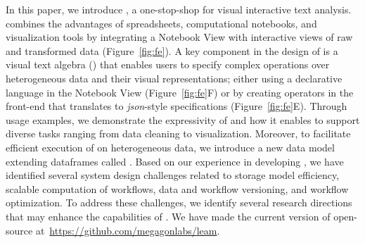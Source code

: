 

In this paper, we introduce \system, a one-stop-shop for visual interactive text analysis. \system combines the advantages of spreadsheets, computational notebooks, and visualization tools by integrating a Notebook View with interactive views of raw and transformed data (Figure~\ref{fig:fe}). A key component in the design of \system is a visual text algebra (\vta) that enables users to specify complex \vita operations over heterogeneous data and their visual representations; either using a declarative language in the Notebook View (Figure~\ref{fig:fe}F) or by creating operators in the front-end that translates to \emph{json}-style \vta specifications (Figure~\ref{fig:fe}E). Through usage examples, we demonstrate the expressivity of \vta and how it enables \system to support diverse tasks ranging from data cleaning to visualization. Moreover, to facilitate efficient execution of \vta on heterogeneous data, we introduce a new data model extending dataframes called \vitaframe. Based on our experience in developing \system,
we have identified several system design challenges related to storage model efficiency, scalable computation of \vita workflows, data and workflow versioning, and workflow optimization. To address these challenges, we identify several research directions that may enhance the capabilities of \system. We have made the current version of \system open-source at~\url{https://github.com/megagonlabs/leam}.

